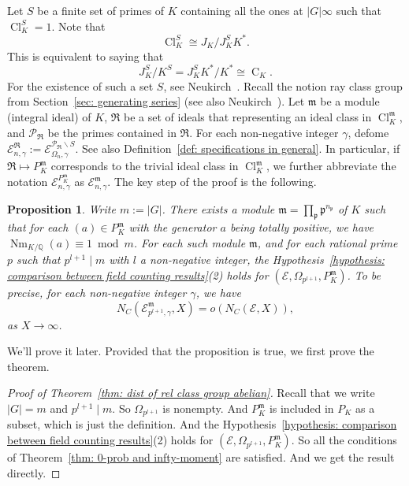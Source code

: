 \documentclass{amsart}
\numberwithin{equation}{section}
\theoremstyle{plain}
\newtheorem{proposition}[theorem]{Proposition}
\theoremstyle{definition}
\theoremstyle{remark}
\begin{document}
Let $S$ be a finite set of primes of $K$ containing all the ones at $\lvert G\rvert\infty$ such that $\operatorname{Cl}_K^S=1$.
Note that
\begin{equation*}
	\operatorname{Cl}_K^S\cong J_K/J_K^{S}K^*.
\end{equation*}
This is equivalent to saying that
\begin{equation*}
	J_K^S/K^S=J_K^SK^*/K^*\cong\operatorname{C}_K.
\end{equation*}
For the existence of such a set $S$, see Neukirch~\cite[VI.1.4]{neukirch2013algebraic}.
Recall the notion ray class group from Section~\ref{sec: generating series} (see also Neukirch~\cite[VI.1.7]{neukirch2013algebraic}).
Let $\mathfrak{m}$ be a module (integral ideal) of $K$, $\mathfrak{R}$ be a set of ideals that representing an ideal class in $\operatorname{Cl}_K^{\mathfrak{m}}$, and $\mathcal{P}_{\mathfrak{R}}$ be the primes contained in $\mathfrak{R}$.
For each non-negative integer $\gamma$, defome $\mathcal{E}_{n,\gamma}^{\mathfrak{R}}:=\mathcal{E}_{\Omega_n,\gamma}^{\mathcal{P}_{\mathfrak{R}}\backslash S}$.
See also Definition~\ref{def: specifications in general}.
In particular, if $\mathfrak{R}\mapsto P_K^{\mathfrak{m}}$ corresponds to the trivial ideal class in $\operatorname{Cl}_K^{\mathfrak{m}}$, we further abbreviate the notation $\mathcal{E}_{n,\gamma}^{P_K^{\mathfrak{m}}}$ as $\mathcal{E}_{n,\gamma}^{\mathfrak{m}}$.
The key step of the proof is the following.
\begin{proposition}\label{prop: hypothesis abelian}
	Write $m:=\lvert G\rvert$.
	There exists a module $\mathfrak{m}=\prod_{\mathfrak{p}}\mathfrak{p}^{n_{\mathfrak{p}}}$ of $K$ such that for each $(a)\in P_K^{\mathfrak{m}}$ with the generator $a$ being totally positive, we have $\operatorname{Nm}_{K/\mathbb{Q}}(a)\equiv1\bmod{m}$.
	For each such module $\mathfrak{m}$, and for each rational prime $p$ such that $p^{l+1}\mid m$ with $l$ a non-negative integer, the Hypothesis~\ref{hypothesis: comparison between field counting results}(2) holds for $(\mathcal{E},\Omega_{p^{l+1}},P_K^{\mathfrak{m}})$.
	To be precise, for each non-negative integer $\gamma$, we have
	\begin{equation*}
		N_{C}(\mathcal{E}_{p^{l+1},\gamma}^{\mathfrak{m}},X)=o(N_{C}(\mathcal{E},X)),
	\end{equation*}
	as $X\to\infty$.
\end{proposition}
We'll prove it later.
Provided that the proposition is true, we first prove the theorem.
\begin{proof}[Proof of Theorem~\ref{thm: dist of rel class group abelian}]
	Recall that we write $\lvert G\rvert=m$ and $p^{l+1}\mid m$.
	So $\Omega_{p^{l+1}}$ is nonempty.
	And $P_K^{\mathfrak{m}}$ is included in $P_K$ as a subset, which is just the definition.
	And the Hypothesis~\ref{hypothesis: comparison between field counting results}(2) holds for $(\mathcal{E},\Omega_{p^{l+1}},P_K^{\mathfrak{m}})$.
	So all the conditions of Theorem~\ref{thm: 0-prob and infty-moment} are satisfied.
	And we get the result directly.
\end{proof}
\end{document}
